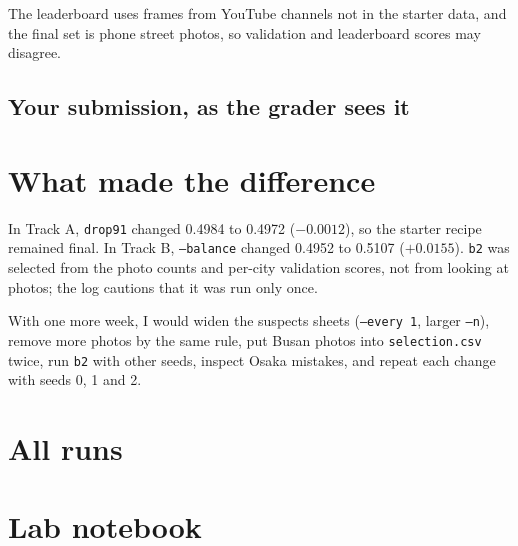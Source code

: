 \documentclass[11pt]{article}
\begin{document}
The leaderboard uses frames from YouTube channels not in the starter data, and
the final set is phone street photos, so validation and leaderboard scores may disagree.

\subsection*{Your submission, as the grader sees it}

\section*{What made the difference}

In Track A, \texttt{drop91} changed 0.4984 to 0.4972 ($-0.0012$), so the starter
recipe remained final. In Track B, \texttt{--balance} changed 0.4952 to 0.5107
($+0.0155$). \texttt{b2} was selected from the photo counts and per-city validation scores, not from looking at photos; the log cautions that it was run only once.

With one more week, I would widen the suspects sheets (\texttt{--every 1}, larger
\texttt{--n}), remove more photos by the same rule, put Busan photos into
\texttt{selection.csv} twice, run \texttt{b2} with other seeds, inspect Osaka
mistakes, and repeat each change with seeds 0, 1 and 2.

\section*{All runs}

\section*{Lab notebook}
\end{document}
